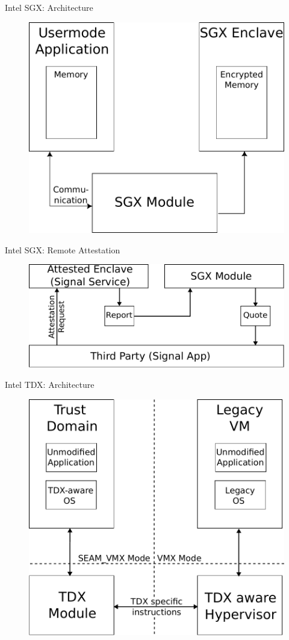 \documentclass[aspectratio=169]{beamer}
\begin{document}
\begin{frame}{Intel SGX: Architecture}
    \begin{figure}
        \includegraphics[width=.45\textwidth]{images/sgx_components.pdf}
    \end{figure}
\end{frame}
\begin{frame}{Intel SGX: Remote Attestation}
    \begin{figure}
        \includegraphics[width=.6\textwidth]{images/sgx_remote_attestation.pdf}
    \end{figure}
\end{frame}
\begin{frame}{Intel TDX: Architecture}
    \begin{figure}
        \includegraphics[width=.5\textwidth]{images/tdx_components.pdf}
    \end{figure}
\end{frame}
\end{document}
